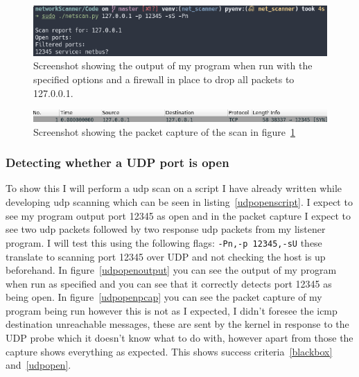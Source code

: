 \documentclass[titlepage]{article}
\let\Oldsubsubsection\subsubsection{}
\renewcommand{\subsubsection}{\FloatBarrier\Oldsubsubsection}
\begin{document}
\begin{figure}[H]
  \centering
  \includegraphics[width=\textwidth]{tcpfilteredoutput.png}
  \caption{%
    Screenshot showing the output of my program when run with the specified options
    and a firewall in place to drop all packets to 127.0.0.1.
  }\label{tcpfilteredoutput}
\end{figure}

\begin{figure}[H]
  \centering
  \includegraphics[width=\textwidth]{tcpfilteredpcap.png}
  \caption{%
    Screenshot showing the packet capture of the scan in figure~\ref{tcpfilteredoutput}
  }\label{tcpfilteredpcap}
\end{figure}

\subsubsection{Detecting whether a UDP port is open}
To show this I will perform a \gls{udp} scan on a script I have already written while
developing \gls{udp} scanning which can be seen in listing~\ref{udpopenscript}.
I expect to see my program output port 12345 as open and in the packet capture I
expect to see two \gls{udp} packets followed by two response \gls{udp} packets from my
listener program. I will test this using the following flags: \verb|-Pn,-p 12345,-sU|
these translate to scanning port 12345 over UDP and not checking the host is up beforehand.
In figure~\ref{udpopenoutput} you can see the output of my program when run as specified
and you can see that it correctly detects port 12345 as being open.
In figure~\ref{udpopenpcap} you can see the packet capture of my program being run
however this is not as I expected, I didn't foresee the \gls{icmp} destination unreachable
messages, these are sent by the kernel in response to the UDP probe which it doesn't know what
to do with, however apart from those the capture shows everything as expected.
This shows success criteria~\ref{blackbox} and~\ref{udpopen}.


\end{document}
